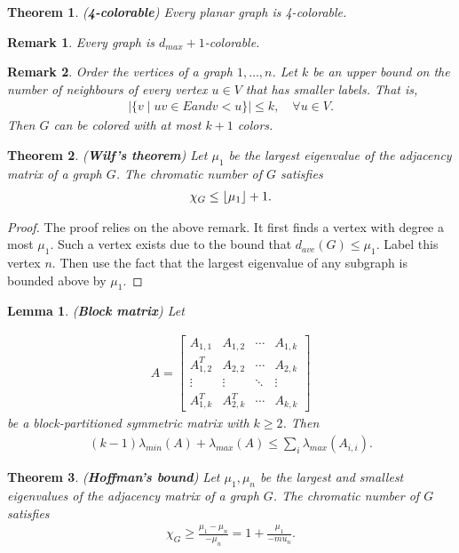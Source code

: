 \documentclass[]{article}
\newtheorem{theorem}{Theorem}[section]
\newtheorem{lemma}{Lemma}[section]
\newtheorem{remark}{Remark}[section]
\DeclarePairedDelimiter\floor{\lfloor}{\rfloor}
\begin{document}
	\begin{theorem} (\textbf{4-colorable})
		Every planar graph is 4-colorable. 
	\end{theorem}
	
	\begin{remark}
		Every graph is $d_{max}+1$-colorable.
	\end{remark}
	
	\begin{remark}
		Order the vertices of a graph $1,\dots,n$. Let $k$ be an upper bound on the number of neighbours of every vertex $u \in V$ that has smaller labels. That is, 
		\begin{align*}
		|\{v \mid uv \in E and v < u\}| \le k, \quad \forall u \in V.
		\end{align*}
		Then $G$ can be colored with at most $k+1$ colors. 
	\end{remark}
	
	\begin{theorem} (\textbf{Wilf's theorem})
		Let $\mu_1$ be the largest eigenvalue of the adjacency matrix of a graph $G$. The chromatic number of $G$ satisfies 
		\begin{align*}
		\chi_G \le \floor*{\mu_1} + 1.
		\end{align*}
	\end{theorem}
	\begin{proof}
		The proof relies on the above remark. It first finds a vertex with degree a most $\mu_1$. Such a vertex exists due to the bound that $d_{ave}(G) \le \mu_1$. Label this vertex $n$. Then use the fact that the largest eigenvalue of any subgraph is bounded above by $\mu_1$.
	\end{proof}
	
	
	\begin{lemma} (\textbf{Block matrix})
		Let 
		
		\begin{align*}
		A = 
		\begin{bmatrix}
		A_{1,1} & A_{1,2} & \cdots & A_{1,k} \\
		A_{1,2}^T & A_{2,2} & \cdots & A_{2,k} \\
		\vdots & \vdots & \ddots & \vdots \\
		A_{1,k}^T & A_{2,k}^T & \cdots & A_{k,k}
		\end{bmatrix}
		\end{align*}
		be a block-partitioned symmetric matrix with $k \ge 2$. Then 
		\begin{align*}
		(k-1) \lambda_{min}(A) + \lambda_{max}(A) \le \sum_i \lambda_{max}(A_{i,i}).
		\end{align*}
	\end{lemma}
	
	
	\begin{theorem} (\textbf{Hoffman's bound})
		Let $\mu_1,\mu_n$ be the largest and smallest eigenvalues of the adjacency matrix of a graph $G$. The chromatic number of $G$ satisfies 
		\begin{align*}
		\chi_G \ge \frac{\mu_1 - \mu_n}{-\mu_n} = 1 + \frac{\mu_1}{-mu_n}.
		\end{align*}
	\end{theorem}
	
	
	
	
\end{document}
